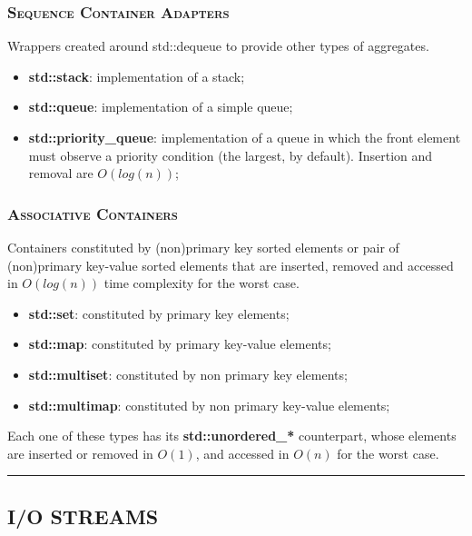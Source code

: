 \documentclass[10pt]{article}
\begin{document}
\begin{multicols*}{5}
{\subsubsection*{\textsc{Sequence Container Adapters}} 
\noindent
Wrappers created around std::dequeue to provide other types of aggregates.

\begin{itemize}[leftmargin=*,topsep=0.25pt]
  \setlength\itemsep{.3pt}
	\item \textbf{std::stack}: implementation of a stack;
	\item \textbf{std::queue}: implementation of a simple queue;
	\item \textbf{std::priority\_queue}: implementation of a queue in which the front element must observe a priority condition (the largest, by default). Insertion and removal are $O(log(n))$;
\end{itemize}
\noindent

\subsubsection*{\textsc{Associative Containers}} 
\noindent
Containers constituted by (non)primary key sorted elements or pair of (non)primary key-value sorted elements that are  inserted, removed and accessed in $O(log(n))$ time complexity for the worst case.

\begin{itemize}[leftmargin=*,topsep=0.25pt]
  \setlength\itemsep{.3pt}
	\item \textbf{std::set}: constituted by primary key elements;
	\item \textbf{std::map}: constituted by primary key-value elements;
	\item \textbf{std::multiset}: constituted by non primary key elements;
	\item \textbf{std::multimap}: constituted by non primary key-value elements;  
\end{itemize}
\noindent
Each one of these types has its \textbf{std::unordered\_*} counterpart, whose elements are inserted or removed in $O(1)$, and accessed in $O(n)$ for the worst case. 


}

\par\noindent\rule{155pt}{0.4pt}

{\color{Blue}
\subsection*{I/O STREAMS}	
\blindtext
}


\end{multicols*}
\end{document}
